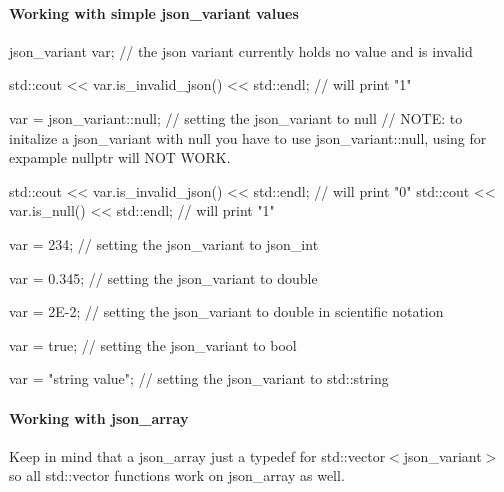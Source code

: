 \paragraph*{\label{_working_with_simple_section}%
Working with simple json\+\_\+variant values}


\begin{DoxyCode}
json\_variant var;           // the json variant currently holds no value and is invalid

std::cout << var.is\_invalid\_json() << std::endl;    // will print "1"

var = json\_variant::null;   // setting the json\_variant to null
// NOTE: to initalize a json\_variant with null you have to use json\_variant::null, using for expample
       nullptr will NOT WORK.

std::cout << var.is\_invalid\_json() << std::endl;    // will print "0"
std::cout << var.is\_null() << std::endl;            // will print "1"

var = 234;                  // setting the json\_variant to json\_int

var = 0.345;                // setting the json\_variant to double

var = 2E-2;                 // setting the json\_variant to double in scientific notation

var = true;                 // setting the json\_variant to bool

var = "string value";       // setting the json\_variant to std::string
\end{DoxyCode}


\paragraph*{\label{_working_with_json_array_section}%
Working with json\+\_\+array}

Keep in mind that a {\ttfamily json\+\_\+array} just a {\ttfamily typedef} for {\ttfamily std\+::vector$<$json\+\_\+variant$>$} so all {\ttfamily std\+::vector} functions work on {\ttfamily json\+\_\+array} as well.


